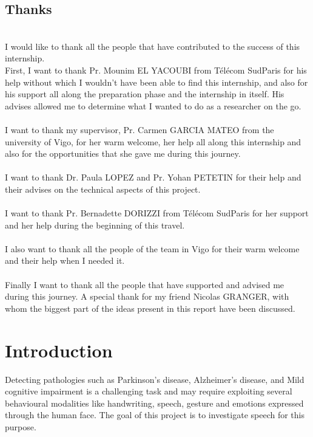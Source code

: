 \documentclass{report}
\begin{document}
	\tableofcontents
	
	\newpage
	
	\section*{Thanks}
	
	~\\[0.5cm]
	I would like to thank all the people that have contributed to the success of this internship.
	\\[1cm]
	
	
	First, I want to thank Pr. Mounim EL YACOUBI from Télécom SudParis for his help without which I wouldn't have been able to find this internship, and also for his support all along the preparation phase and the internship in itself. His advises allowed me to determine what I wanted to do as a researcher on the go.\\\\
	I want to thank my supervisor, Pr. Carmen GARCIA MATEO from the university of Vigo, for her warm welcome, her help all along this internship and also for the opportunities that she gave me during this journey.\\\\
	I want to thank Dr. Paula LOPEZ and Pr. Yohan PETETIN for their help and their advises on the technical aspects of this project.\\\\
	I want to thank Pr. Bernadette DORIZZI from Télécom SudParis for her support and her help during the beginning of this travel.\\\\
	I also want to thank all the people of the team in Vigo for their warm welcome and their help when I needed it.\\\\
	
	Finally I want to thank all the people that have supported and advised me during this journey. A special thank for my friend Nicolas GRANGER, with whom the biggest part of the ideas present in this report have been discussed.
	
	\newpage
	
	\chapter{Introduction}
	
	Detecting pathologies such as Parkinson's disease, Alzheimer's disease, and Mild cognitive impairment is a challenging task and may require exploiting several behavioural modalities like handwriting, speech, gesture and emotions expressed through the human face. The goal of this project is to investigate speech for this purpose.\\
	
\end{document}
